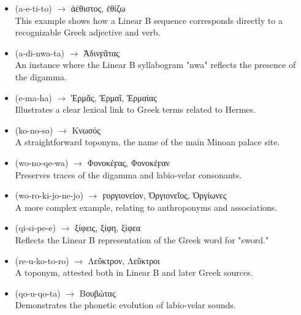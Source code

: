 \begin{itemize}  
    \item \textlinb{\Ba\Be\Bti\Bto} (a-e-ti-to) $\rightarrow$ \textgreek{ἀέθιστος}, \textgreek{ἐθίζω} \\  
    This example shows how a Linear B sequence corresponds directly to a recognizable Greek adjective and verb.

    \item \textlinb{\Ba\Bdi\Bnwa\Bta} (a-di-nwa-ta) $\rightarrow$ \textgreek{Ἀδινϝᾶτας} \\  
    An instance where the Linear B syllabogram "nwa" reflects the presence of the digamma.

    \item \textlinb{\Be\Bma\Baii} (e-ma-ha) $\rightarrow$ \textgreek{Ἑρμᾶς}, \textgreek{Ἑρμαῖ}, \textgreek{Ἑρμαίας} \\  
    Illustrates a clear lexical link to Greek terms related to Hermes.

    \item \textlinb{\Bko\Bno\Bso} (ko-no-so) $\rightarrow$ \textgreek{Κνωσός}\\  
    A straightforward toponym, the name of the main Minoan palace site.

    \item \textlinb{\Bwo\Bno\Bqe\Bwa} (wo-no-qe-wa) $\rightarrow$ \textgreek{Φονοκέϝας}, \textgreek{Φονοκέϝαν} \\  
    Preserves traces of the digamma and labio-velar consonants.

    \item \textlinb{\Bwo\Bro\Bki\Bjo\Bne\Bjo} (wo-ro-ki-jo-ne-jo) $\rightarrow$ \textgreek{ϝοργιονείον}, \textgreek{Ὀργιονεῖος}, \textgreek{Ὀργίωνες} \\  
    A more complex example, relating to anthroponyms and associations.

    \item \textlinb{\Bqi\Bsi\Bpe\Be} (qi-si-pe-e) $\rightarrow$ \textgreek{ξίφεις}, \textgreek{ξίφη}, \textgreek{ξίφεα} \\  
    Reflects the Linear B representation of the Greek word for "sword."  

    \item \textlinb{\Bre\Bu\Bko\Bto\Bro} (re-u-ko-to-ro) $\rightarrow$ \textgreek{Λεῦκτρον}, \textgreek{Λεῦκτροι} \\  
    A toponym, attested both in Linear B and later Greek sources.

    \item \textlinb{\Bqo\Bu\Bqo\Bta} (qo-u-qo-ta) $\rightarrow$ \textgreek{Βουβώτας} \\  
    Demonstrates the phonetic evolution of labio-velar sounds.


\end{itemize}
